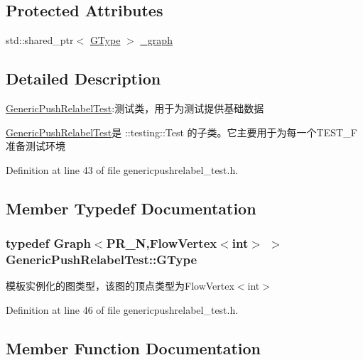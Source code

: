 \subsection*{Protected Attributes}
\begin{DoxyCompactItemize}
\item 
std\+::shared\+\_\+ptr$<$ \hyperlink{class_generic_push_relabel_test_af6684144e5419944b2fe025117401bbc}{G\+Type} $>$ \hyperlink{class_generic_push_relabel_test_aa363ed3e48e55d7f5451797f3432554c}{\+\_\+graph}
\end{DoxyCompactItemize}


\subsection{Detailed Description}
\hyperlink{class_generic_push_relabel_test}{Generic\+Push\+Relabel\+Test}\+:测试类，用于为测试提供基础数据 

{\ttfamily \hyperlink{class_generic_push_relabel_test}{Generic\+Push\+Relabel\+Test}}是 {\ttfamily \+::testing\+::\+Test} 的子类。它主要用于为每一个{\ttfamily T\+E\+S\+T\+\_\+\+F}准备测试环境 

Definition at line 43 of file genericpushrelabel\+\_\+test.\+h.



\subsection{Member Typedef Documentation}
\hypertarget{class_generic_push_relabel_test_af6684144e5419944b2fe025117401bbc}{}
\subsubsection[{G\+Type}]{\setlength{\rightskip}{0pt plus 5cm}typedef {\bf Graph}$<$P\+R\+\_\+\+N,{\bf Flow\+Vertex}$<$int$>$ $>$ {\bf Generic\+Push\+Relabel\+Test\+::\+G\+Type}}\label{class_generic_push_relabel_test_af6684144e5419944b2fe025117401bbc}
模板实例化的图类型，该图的顶点类型为{\ttfamily Flow\+Vertex$<$int$>$} 

Definition at line 46 of file genericpushrelabel\+\_\+test.\+h.



\subsection{Member Function Documentation}
\hypertarget{class_generic_push_relabel_test_ad6fe14069d4f8edf4718c55f23b2e0d8}{}

